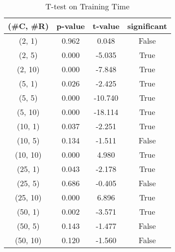 \begin{table}[h]
\centering
\caption{T-test on Training Time}
\label{tab:t-testTraining}
\begin{tabular}{|c|c|c|c|}
\toprule
(\#C, \#R) &  p-value &  t-value &  significant \\
\midrule
  (2, 1) &    0.962 &    0.048 &        False \\
  (2, 5) &    0.000 &   -5.035 &         True \\
 (2, 10) &    0.000 &   -7.848 &         True \\
  (5, 1) &    0.026 &   -2.425 &         True \\
  (5, 5) &    0.000 &  -10.740 &         True \\
 (5, 10) &    0.000 &  -18.114 &         True \\
 (10, 1) &    0.037 &   -2.251 &         True \\
 (10, 5) &    0.134 &   -1.511 &        False \\
(10, 10) &    0.000 &    4.980 &         True \\
 (25, 1) &    0.043 &   -2.178 &         True \\
 (25, 5) &    0.686 &   -0.405 &        False \\
(25, 10) &    0.000 &    6.896 &         True \\
 (50, 1) &    0.002 &   -3.571 &         True \\
 (50, 5) &    0.143 &   -1.477 &        False \\
(50, 10) &    0.120 &   -1.560 &        False \\
\bottomrule
\end{tabular}
\end{table}
